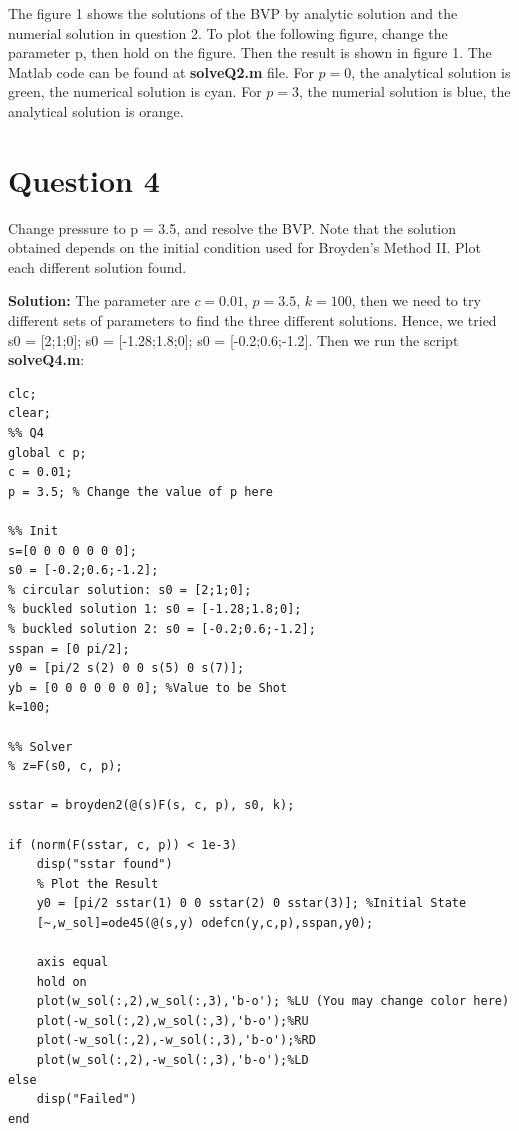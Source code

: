\documentclass{article}
\begin{document}
The figure 1 shows the solutions of the BVP by analytic solution and the numerial solution in question 2. To plot the following figure, change the parameter p, then hold on the figure. Then the result is shown in figure 1. The Matlab code can be found at \textbf{solveQ2.m} file. For $p=0$, the analytical solution is green, the numerical solution is cyan. For $p=3$, the numerial solution is blue, the analytical solution is orange.




\section*{Question 4} 
Change pressure to p = 3.5, and resolve the BVP. Note that the solution obtained depends
on the initial condition used for Broyden’s Method II. Plot each different solution found.


\textbf{Solution:} 
The parameter are $c=0.01$, $p=3.5$, $k=100$, then we need to try different sets of parameters to find the three different solutions. Hence, we tried s0 = [2;1;0]; s0 = [-1.28;1.8;0]; s0 = [-0.2;0.6;-1.2]. Then we run the script \textbf{solveQ4.m}:

\begin{lstlisting}
clc;
clear;
%% Q4
global c p;
c = 0.01;
p = 3.5; % Change the value of p here

%% Init
s=[0 0 0 0 0 0 0]; 
s0 = [-0.2;0.6;-1.2];
% circular solution: s0 = [2;1;0];
% buckled solution 1: s0 = [-1.28;1.8;0];
% buckled solution 2: s0 = [-0.2;0.6;-1.2];
sspan = [0 pi/2];
y0 = [pi/2 s(2) 0 0 s(5) 0 s(7)];
yb = [0 0 0 0 0 0 0]; %Value to be Shot
k=100;

%% Solver
% z=F(s0, c, p);

sstar = broyden2(@(s)F(s, c, p), s0, k); 

if (norm(F(sstar, c, p)) < 1e-3)
	disp("sstar found")
	% Plot the Result
	y0 = [pi/2 sstar(1) 0 0 sstar(2) 0 sstar(3)]; %Initial State
	[~,w_sol]=ode45(@(s,y) odefcn(y,c,p),sspan,y0);
	
	axis equal 
	hold on
	plot(w_sol(:,2),w_sol(:,3),'b-o'); %LU (You may change color here)
	plot(-w_sol(:,2),w_sol(:,3),'b-o');%RU
	plot(-w_sol(:,2),-w_sol(:,3),'b-o');%RD
	plot(w_sol(:,2),-w_sol(:,3),'b-o');%LD
else
	disp("Failed")
end
\end{lstlisting}
\end{document}

